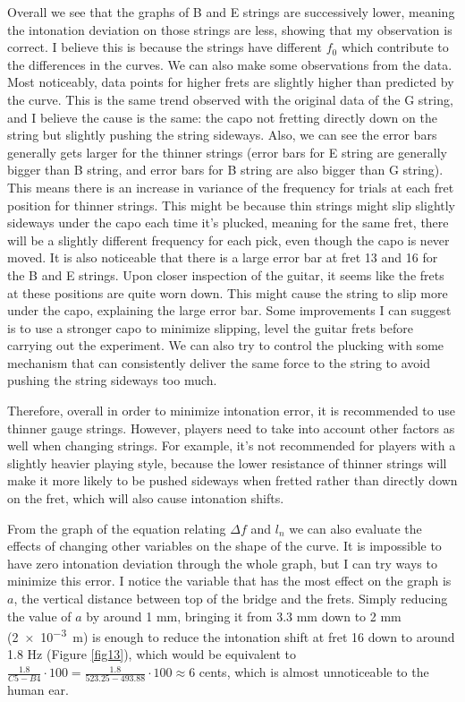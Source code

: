 Overall we see that the graphs of B and E strings are successively lower, meaning the intonation deviation on those strings are less, showing that my observation is correct. I believe this is because the strings have different $f_0$ which contribute to the differences in the curves. We can also make some observations from the data. Most noticeably, data points for higher frets are slightly higher than predicted by the curve. This is the same trend observed with the original data of the G string, and I believe the cause is the same: the capo not fretting directly down on the string but slightly pushing the string sideways. Also, we can see the error bars generally gets larger for the thinner strings (error bars for E string are generally bigger than B string, and error bars for B string are also bigger than G string). This means there is an increase in variance of the frequency for trials at each fret position for thinner strings. This might be because thin strings might slip slightly sideways under the capo each time it's plucked, meaning for the same fret, there will be a slightly different frequency for each pick, even though the capo is never moved. It is also noticeable that there is a large error bar at fret 13 and 16 for the B and E strings. Upon closer inspection of the guitar, it seems like the frets at these positions are quite worn down. This might cause the string to slip more under the capo, explaining the large error bar. Some improvements I can suggest is to use a stronger capo to minimize slipping, level the guitar frets before carrying out the experiment. We can also try to control the plucking with some mechanism that can consistently deliver the same force to the string to avoid pushing the string sideways too much.

Therefore, overall in order to minimize intonation error, it is recommended to use thinner gauge strings. However, players need to take into account other factors as well when changing strings. For example, it's not recommended for players with a slightly heavier playing style, because the lower resistance of thinner strings will make it more likely to be pushed sideways when fretted rather than directly down on the fret, which will also cause intonation shifts.

From the graph of the equation relating $\Delta f$ and $l_n$ we can also evaluate the effects of changing other variables on the shape of the curve. It is impossible to have zero intonation deviation through the whole graph, but I can try ways to minimize this error. I notice the variable that has the most effect on the graph is $a$, the vertical distance between top of the bridge and the frets. Simply reducing the value of $a$ by around 1 mm, bringing it from 3.3 mm down to 2 mm (\SI{2e-3}{m}) is enough to reduce the intonation shift at fret 16 down to around 1.8 Hz (Figure \ref{fig13}), which would be equivalent to $\frac{1.8}{C5-B4}\cdot 100 = \frac{1.8}{523.25-493.88} \cdot 100 \approx 6$ cents, which is almost unnoticeable to the human ear. \cite{loeffler}

